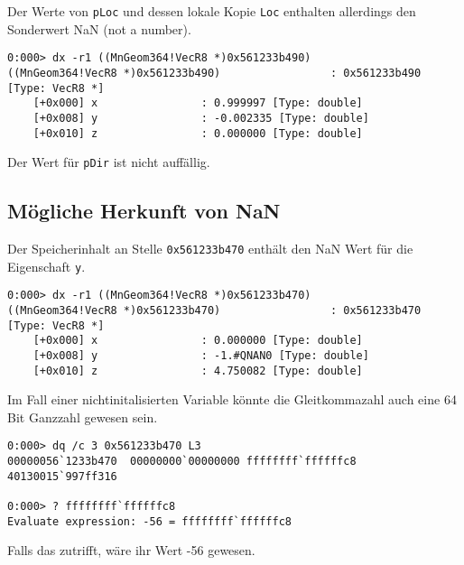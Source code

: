 Der Werte von \verb|pLoc| und dessen lokale Kopie \verb|Loc| enthalten allerdings den Sonderwert NaN (not a number).

\begin{lstlisting}
0:000> dx -r1 ((MnGeom364!VecR8 *)0x561233b490)
((MnGeom364!VecR8 *)0x561233b490)                 : 0x561233b490 [Type: VecR8 *]
    [+0x000] x                : 0.999997 [Type: double]
    [+0x008] y                : -0.002335 [Type: double]
    [+0x010] z                : 0.000000 [Type: double]
\end{lstlisting}

Der Wert für \verb|pDir| ist nicht auffällig.

\subsection{Mögliche Herkunft von NaN}

Der Speicherinhalt an Stelle \verb|0x561233b470| enthält den NaN Wert für die Eigenschaft \verb|y|.

\begin{lstlisting}
0:000> dx -r1 ((MnGeom364!VecR8 *)0x561233b470)
((MnGeom364!VecR8 *)0x561233b470)                 : 0x561233b470 [Type: VecR8 *]
    [+0x000] x                : 0.000000 [Type: double]
    [+0x008] y                : -1.#QNAN0 [Type: double]
    [+0x010] z                : 4.750082 [Type: double]
\end{lstlisting}

Im Fall einer nichtinitalisierten Variable könnte die Gleitkommazahl auch eine 64 Bit Ganzzahl gewesen sein. 

\begin{lstlisting}
0:000> dq /c 3 0x561233b470 L3
00000056`1233b470  00000000`00000000 ffffffff`ffffffc8 40130015`997ff316

0:000> ? ffffffff`ffffffc8
Evaluate expression: -56 = ffffffff`ffffffc8
\end{lstlisting}

Falls das zutrifft, wäre ihr Wert -56 gewesen.